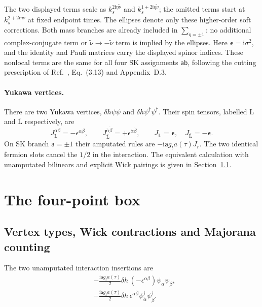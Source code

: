 \documentclass[a4paper,12pt]{article}
\newcommand{\ii}{\mathrm i}
\newcommand{\tn}{\tilde\nu}
\def\aa{\mathsf a}
\newcommand{\bb}{\mathsf b}
\newcommand{\epsmat}{\boldsymbol{\epsilon}}
\begin{document}
The two displayed terms scale as $k_s^{2\ii \eta\tn}$ and
$k_s^{1+2\ii \eta\tn}$; the omitted terms start at
$k_s^{2+2\ii \eta\tn}$ at fixed endpoint times.
The ellipses denote only these higher-order soft corrections.
Both mass branches are already included in $\sum_{\eta=\pm1}$:
no additional complex-conjugate term or $\tn\to-\tn$ term is
implied by the ellipses.
Here $\epsmat=\ii\sigma^2$, and the identity and Pauli matrices carry
the displayed spinor indices. These nonlocal terms are the same for
all four SK assignments $\aa\bb$, following the cutting prescription of
Ref.~\cite{you}, Eq.~(3.13) and Appendix~D.3.

\paragraph{Yukawa vertices.}
There are two Yukawa vertices, $\delta h\psi\psi$
and $\delta h\psi^\dagger\psi^\dagger$.
Their spin tensors, labelled $\mathrm L$ and $\overline{\mathrm L}$ respectively, are
\begin{equation}
 J_{\mathrm L}^{\alpha\beta}=-\epsilon^{\alpha\beta},\qquad
 J_{\overline{\mathrm L}}^{\dot\alpha\dot\beta}
 =+\epsilon^{\dot\alpha\dot\beta},\qquad
 J_{\mathrm L}=\epsmat,\quad J_{\overline{\mathrm L}}=-\epsmat.
 \label{eq:vertex-tensors}
\end{equation}
On SK branch $\aa=\pm1$ their amputated rules are
$-\ii \aa g_t a(\tau)J_r$. The two identical fermion slots cancel the
$1/2$ in the interaction. The equivalent calculation with unamputated
bilinears and explicit Wick pairings is given in Section~\ref{sec:wick}.

\section{The four-point box}
\subsection{Vertex types, Wick contractions and Majorana counting}
\label{sec:wick}

The two unamputated interaction insertions are
\begin{align}
 &-\frac{\ii \aa g_ta(\tau)}2\delta h\,
 (-\epsilon^{\alpha\beta})
 \psi_\alpha\psi_\beta,
 \nonumber\\
 &-\frac{\ii \aa g_ta(\tau)}2\delta h\,
 \epsilon^{\dot\alpha\dot\beta}
 \psi^\dagger_{\dot\alpha}\psi^\dagger_{\dot\beta}.
 \label{eq:vertex-rule}
\end{align}
\end{document}
